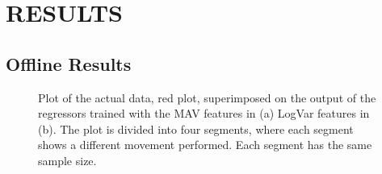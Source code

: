 \section{RESULTS}%

\subsection{Offline Results}


\begin{figure}[H]
	\centering
	\label{fig:SuperPositionTraining}
	\caption{Plot of the actual data, red plot, superimposed on the output of the regressors trained with the MAV features in (a) LogVar features in (b). The plot is divided into four segments, where each segment shows a different movement performed. Each segment has the same sample size.}
\end{figure}

